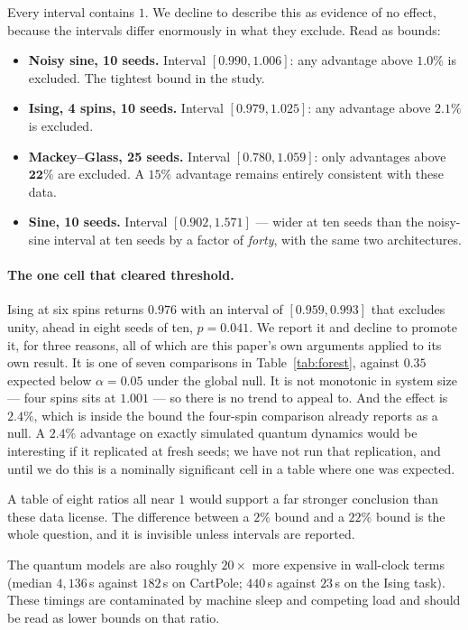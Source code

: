 \documentclass[11pt,onecolumn]{article}
\begin{document}
Every interval contains $1$. We decline to describe this as evidence of
no effect, because the intervals differ enormously in what they
exclude. Read as bounds:

\begin{itemize}\itemsep2pt
\item \textbf{Noisy sine, 10 seeds.} Interval $[0.990, 1.006]$: any
      advantage above $\mathbf{1.0\%}$ is excluded. The tightest bound
      in the study.
\item \textbf{Ising, 4 spins, 10 seeds.} Interval $[0.979, 1.025]$: any
      advantage above $\mathbf{2.1\%}$ is excluded.
\item \textbf{Mackey--Glass, 25 seeds.} Interval $[0.780, 1.059]$: only
      advantages above $\mathbf{22\%}$ are excluded. A $15\%$ advantage
      remains entirely consistent with these data.
\item \textbf{Sine, 10 seeds.} Interval $[0.902, 1.571]$ --- wider at
      ten seeds than the noisy-sine interval at ten seeds by a factor
      of \emph{forty}, with the same two architectures.
\end{itemize}

\paragraph{The one cell that cleared threshold.}
Ising at six spins returns $0.976$ with an interval of $[0.959, 0.993]$
that excludes unity, ahead in eight seeds of ten, $p = 0.041$. We report
it and decline to promote it, for three reasons, all of which are this
paper's own arguments applied to its own result. It is one of seven
comparisons in Table~\ref{tab:forest}, against $0.35$ expected below
$\alpha = 0.05$ under the global null. It is not monotonic in system
size --- four spins sits at $1.001$ --- so there is no trend to appeal
to. And the effect is $2.4\%$, which is inside the bound the four-spin
comparison already reports as a null. A $2.4\%$ advantage on exactly
simulated quantum dynamics would be interesting if it replicated at
fresh seeds; we have not run that replication, and until we do this is
a nominally significant cell in a table where one was expected.

A table of eight ratios all near $1$ would support a far stronger
conclusion than these data license. The difference between a $2\%$ bound
and a $22\%$ bound is the whole question, and it is invisible unless
intervals are reported.

The quantum models are also roughly $20\times$ more expensive in
wall-clock terms (median $4{,}136$\,s against $182$\,s on CartPole;
$440$\,s against $23$\,s on the Ising task). These timings are
contaminated by machine sleep and competing load and should be read as
lower bounds on that ratio.
\end{document}
